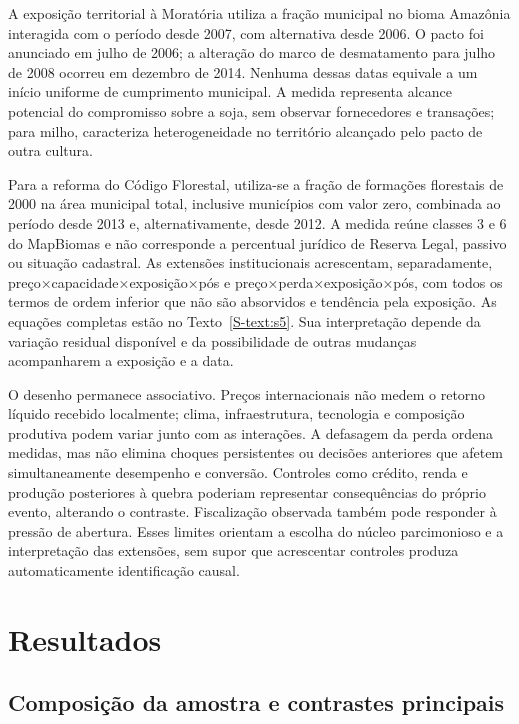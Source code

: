 A exposição territorial à Moratória utiliza a fração municipal no bioma Amazônia interagida com o período desde 2007, com alternativa desde 2006. O pacto foi anunciado em julho de 2006; a alteração do marco de desmatamento para julho de 2008 ocorreu em dezembro de 2014. Nenhuma dessas datas equivale a um início uniforme de cumprimento municipal. A medida representa alcance potencial do compromisso sobre a soja, sem observar fornecedores e transações; para milho, caracteriza heterogeneidade no território alcançado pelo pacto de outra cultura.

Para a reforma do Código Florestal, utiliza-se a fração de formações florestais de 2000 na área municipal total, inclusive municípios com valor zero, combinada ao período desde 2013 e, alternativamente, desde 2012. A medida reúne classes 3 e 6 do MapBiomas e não corresponde a percentual jurídico de Reserva Legal, passivo ou situação cadastral. As extensões institucionais acrescentam, separadamente, preço×capacidade×exposição×pós e preço×perda×exposição×pós, com todos os termos de ordem inferior que não são absorvidos e tendência pela exposição. As equações completas estão no Texto~\ref{S-text:s5}. Sua interpretação depende da variação residual disponível e da possibilidade de outras mudanças acompanharem a exposição e a data.

O desenho permanece associativo. Preços internacionais não medem o retorno líquido recebido localmente; clima, infraestrutura, tecnologia e composição produtiva podem variar junto com as interações. A defasagem da perda ordena medidas, mas não elimina choques persistentes ou decisões anteriores que afetem simultaneamente desempenho e conversão. Controles como crédito, renda e produção posteriores à quebra poderiam representar consequências do próprio evento, alterando o contraste. Fiscalização observada também pode responder à pressão de abertura. Esses limites orientam a escolha do núcleo parcimonioso e a interpretação das extensões, sem supor que acrescentar controles produza automaticamente identificação causal.

\section{Resultados}
\label{sec:resultados}

\subsection{Composição da amostra e contrastes principais}

